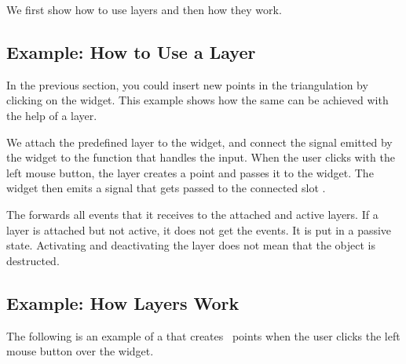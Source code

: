 We first show how to use layers and then how they work.

\subsection{Example: How to Use a Layer}

In the previous section, you could insert new points in the
triangulation by clicking on the widget. This example shows how
the same can be achieved with the help of a layer.

We attach the predefined layer  to the widget,
and connect the signal emitted by the widget to the function that
handles the input.  When the user clicks with the left mouse button,
the layer creates a point and passes it to the widget. The widget then
emits a signal that gets passed to the connected slot
.


The  forwards all events that it receives to the
attached and active layers. If a layer is attached but not active, it
does not get the events. It is put in a passive state. Activating and
deactivating the layer does not mean that the object is destructed.

\subsection{Example: How Layers Work}

The following is an example of a  that creates \cgal\ points when
the user clicks the left mouse button over the widget. 
 
